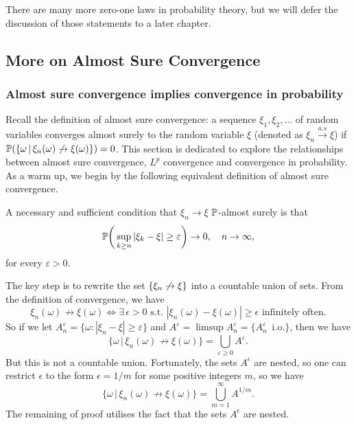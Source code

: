There are many more zero-one laws in probability theory, but we will defer the discussion of those statements to a later chapter.
\newpage 

\subsection{More on Almost Sure Convergence}
\subsubsection{Almost sure convergence implies convergence in probability}
Recall the definition of almost sure convergence: a sequence $\xi_1, \xi_2, \dots$ of random variables converges almost surely to the random variable $\xi$ (denoted as $\xi_n \xrightarrow{a.s} \xi$) if $\mathbb{P}(\left\{ \omega \,|\, \xi_n(\omega) \not \to \xi(\omega) \right \}) = 0$. This section is dedicated to explore the relationships between almost sure convergence, $L^p$ convergence and convergence in probability. As a warm up, we begin by the following equivalent definition of almost sure convergence.

\begin{proposition} \label{prop:as_prob_conv}
A necessary and sufficient condition that $\xi_n \to \xi$ $\mathbb{P}$-almost surely is that 
\begin{equation*}
    \mathbb{P} \bigg(\sup_{k \ge n} |\xi_k - \xi| \ge \varepsilon\bigg) \to 0, \quad n \to \infty,
\end{equation*}
    for every $\varepsilon > 0$.
\end{proposition}

\begin{hint}
The key step is to rewrite the set $\left\{ \xi_n \not\to \xi \right \}$ into a countable union of sets. From the definition of convergence, we have
$$\xi_n(\omega) \not\to \xi(\omega) \iff \exists \, \epsilon > 0 \text{ s.t. } |\xi_n(\omega) - \xi(\omega)| \geq \epsilon \text{ infinitely often.}$$
So if we let $A_n^\varepsilon= \{ \omega: |\xi_n - \xi| \ge \varepsilon\}$ and $A^\varepsilon= \limsup A_n^\varepsilon= \{A_n^\varepsilon\, \text{ i.o.} \}$, then we have 
$$\{\omega \,|\, \xi_n(\omega) \not \to \xi(\omega) \} = \bigcup_{\varepsilon \ge 0} A^\varepsilon.$$
But this is not a countable union. Fortunately, the sets $A^\epsilon$ are nested, so one can restrict $\epsilon$ to the form $\epsilon = 1/m$ for some positive integers $m$, so we have
\begin{equation*}
\{\omega \,|\, \xi_n(\omega) \not \to \xi(\omega) \} =  \bigcup_{m=1}^\infty A^{1/m}.
\end{equation*}
The remaining of proof utilises the fact that the sets $A^\epsilon$ are nested.
\end{hint}

